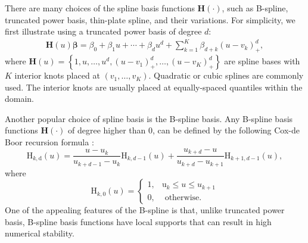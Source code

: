 There are many choices of the spline basis functions $\mathbf{H}({\cdot})$, such as B-spline, truncated power basis, thin-plate spline, and their variations. For simplicity, we first illustrate using a truncated power basis of degree $d$: 
$$
\begin{aligned}
  \mathbf{H}(u) \boldsymbol{\beta} =\beta_{0}+\beta_{1} u+\cdots+\beta_{d} u^{d}+\sum_{k=1}^{K} \beta_{d+k}\left(u-v_{k}\right)_{+}^{d}, 
  \end{aligned}
$$  
where $\mathbf{H}(u)=\left\{1, u, \ldots, u^{d},\left(u-v_{1}\right)_{+}^{d}, \ldots,\left(u-v_{K}\right)_{+}^{d}\right\}$ are spline bases with $K$ interior knots placed at $\left(v_{1}, \ldots, v_{K}\right)$. Quadratic or cubic splines are commonly used. The interior knots are usually placed at equally-spaced quantiles within the domain.

Another popular choice of spline basis is the B-spline basis. Any B-spline basis functions $\mathbf{H}({\cdot})$ of degree higher than 0, can be defined by the following Cox-de Boor recursion formula \citep{boor_practical_2001}: 
$$
  \mathrm{H}_{k, \mathrm{d}}(u)=\frac{u-u_{k}}{u_{k+d-1}-u_{k}} \mathrm{H}_{k, d-1}(u)+\frac{u_{k+d}-u}{u_{k+d}-u_{k+1}} \mathrm{H}_{k+1, d-1}(u),
$$
where
$$
  \mathrm{H}_{k, 0}(u)=\left\{\begin{array}{ll}
  1, & \mathrm{u}_{k} \leq u \leq u_{k+1} \\
  0, & \text { otherwise. }
  \end{array}\right.
$$
One of the appealing features of the B-spline is that, unlike truncated power basis, B-spline basis functions have local supports that can result in high numerical stability.

